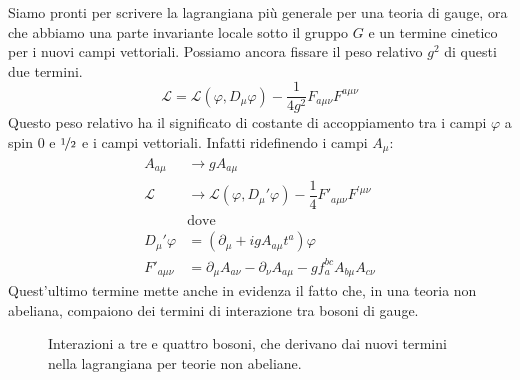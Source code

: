 \documentclass[italian,a4paper]{article}
\theoremstyle{definition}
\newcommand{\lagr}{\ensuremath{\mathscr{L}}}
\newcommand{\dimu}{\ensuremath{\partial_{\mu}}}
\newcommand{\Dimu}{\ensuremath{D_{\mu}}}
\newcommand{\dinu}{\ensuremath{\partial_{\nu}}}
\begin{document}
Siamo pronti per scrivere la lagrangiana pi\`u generale per una teoria di
gauge, ora che abbiamo una parte invariante locale sotto il gruppo $G$ e un
termine cinetico per i nuovi campi vettoriali. Possiamo ancora fissare il
peso relativo $g^{2}$ di questi due termini.
\begin{equation*}
    \lagr = \lagr(\varphi, \Dimu \varphi) -
    \dfrac{1}{4g^2}F_{a\mu\nu}F^{a\mu\nu}
\end{equation*}
Questo peso relativo ha il significato di costante di accoppiamento tra i
campi $\varphi$ a spin $0$ e $\nicefrac{1}{2}$ e i campi vettoriali. Infatti
ridefinendo i campi $A_\mu$:
\begin{align*}
    A_{a\mu} &\longrightarrow g A_{a\mu}\\
    \lagr & \longrightarrow \lagr(\varphi, \Dimu'\varphi) -
    \dfrac{1}{4}F'_{a\mu\nu}F^{'\mu\nu}\\
    &\text{dove}\\
    \Dimu'\varphi &= (\dimu + i g A_{a\mu} t^{a})\varphi\\
    F'_{a\mu\nu} &= \dimu A_{a\nu} - \dinu A_{a\mu} - gf^{bc}_a
    A_{b\mu}A_{c\nu}
\end{align*}
Quest'ultimo termine mette anche in evidenza il fatto che, in una teoria non
abeliana, compaiono dei termini di interazione tra bosoni di gauge.
\begin{figure}[h]
    \begin{center}
        
        
    \end{center}
    \caption{Interazioni a tre e quattro bosoni, che derivano dai nuovi
    termini nella lagrangiana per teorie non abeliane.}
    \label{fig:3bos}
\end{figure}
\end{document}
